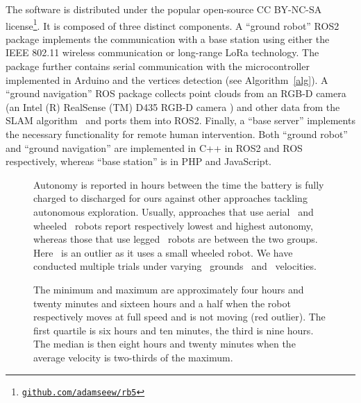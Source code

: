 \documentclass[lettersize,journal,twoside]{IEEEtran}
\theoremstyle{definition}
\begin{document}
The %
software
is distributed under the popular open-source CC BY-NC-SA license\footnote{{\tt\footnotesize \href{https://github.com/adamseew/rb5}{github.com/adamseew/rb5}}}. It is composed of three distinct components. A ``ground robot'' ROS2 %
package implements the communication with a base station using either the IEEE 802.11 wireless communication or long-range LoRa technology. The package further %
contains serial communication with the microcontroller implemented in Arduino and the vertices detection (see Algorithm~\ref{alg}). A ``ground navigation'' ROS package collects point clouds from an RGB-D camera (an Intel (R) RealSense (TM) D435 RGB-D camera%
) and other data from the SLAM algorithm~\cite{labbe2019rtab} and ports them into ROS2. Finally, a ``base server'' implements the necessary functionality for remote human intervention.
Both ``ground robot'' and ``ground navigation'' are implemented in C++ in ROS2 and ROS respectively, whereas ``base station'' is in PHP and JavaScript.

\begin{figure}[t]
  \vspace*{-.45cm}
  \begin{minipage}[t]{0.57\columnwidth}
    \hspace*{-.5cm}
    
  \end{minipage}\hfill
  \begin{minipage}[t]{0.42\columnwidth}
    \vspace*{-5.1cm}
    \centering
    \caption{Autonomy is reported in hours between the time the battery is fully charged to discharged for ours against other approaches tackling autonomous exploration. 
    Usually, approaches that use aerial~\cite{schmid2020efficient,kulkarni2022autonomous} and wheeled~\cite{muller2021openbot,roucek2020darpa,surmann2003autonomous} robots report respectively lowest and highest autonomy, whereas those that use legged~\cite{kulkarni2022autonomous,tranzatto2022cerberus} robots are between the two groups. Here~\cite{muller2021openbot} is an outlier as it uses a small wheeled robot. We have conducted multiple trials under varying ~grounds ~and ~velocities.}
    \label{fig}
  \end{minipage}
  \vspace*{-.63cm}
  \caption*{The minimum and maximum are approximately four hours and twenty minutes and sixteen hours and a half when the robot respectively moves at full speed and is not moving (red outlier). The first quartile is six hours and ten minutes, the third is nine hours. The median is then eight hours and twenty minutes when the average velocity is two-thirds of the maximum.}
  \vspace*{-.3cm}
\end{figure}
\end{document}
